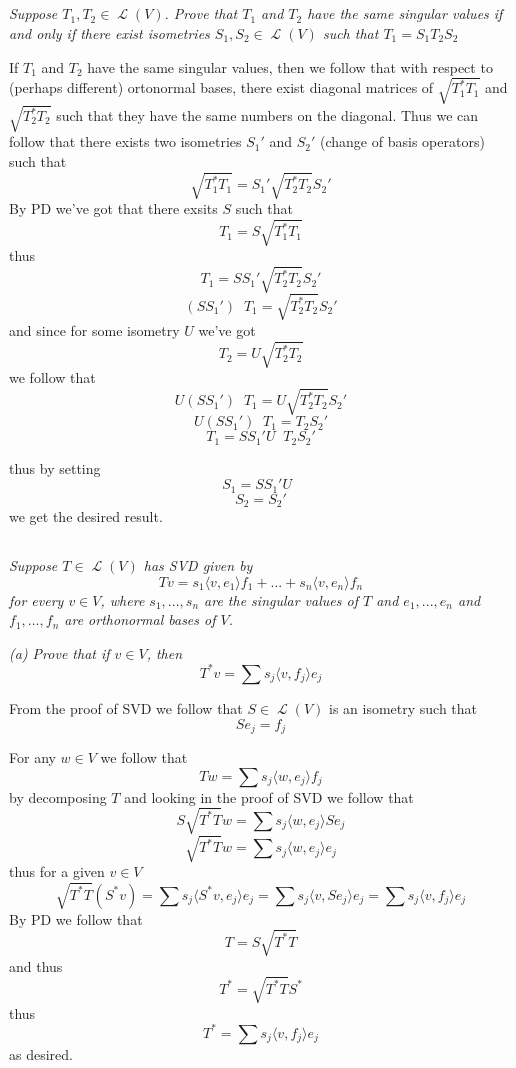\documentclass[11pt,oneside,titlepage]{book}
\DeclareMathOperator \map {\mathcal {L}}
\DeclareMathOperator \inv {^{-1}}
\newcommand{\eangle}[1]{\langle #1 \rangle}
\begin{document}
\subsection{}

\textit{Suppose $T_1, T_2 \in \map(V)$. Prove that $T_1$ and $T_2$ have the same singular values
  if and only if there exist isometries $S_1, S_2 \in \map(V)$ such that $T_1 = S_1 T_2 S_2$}

If $T_1$ and $T_2$ have the same singular values, then we follow that with respect to
(perhaps different) ortonormal bases, there exist diagonal matrices of $\sqrt{T_1^* T_1}$
and $\sqrt{T_2^* T_2}$ such that they have the same numbers on the diagonal. Thus we can
follow that there exists two isometries $S_1'$ and $S_2'$ (change of basis operators) such that
$$\sqrt{T_1^* T_1} = S_1 ' \sqrt{T_2^* T_2} S_2'$$
By PD we've got that there exsits $S$ such that
$$T_1 = S \sqrt{T_1^* T_1}$$
thus
$$T_1 = S S_1 ' \sqrt{T_2^* T_2} S_2'$$
$$(S S_1 ') \inv T_1 =  \sqrt{T_2^* T_2} S_2'$$
and since for some isometry $U$ we've got 
$$T_2 = U \sqrt{T_2^* T_2}$$
we follow that
$$U (S S_1 ') \inv T_1 =  U \sqrt{T_2^* T_2} S_2'$$
$$U (S S_1 ') \inv T_1 =  T_2 S_2'$$
$$T_1 =  S S_1 ' U\inv T_2 S_2'$$

thus by setting
$$S_1 = S S_1 ' U\inv$$
$$S_2 = S_2'$$
we get the desired result.

\subsection{}

\textit{Suppose $T \in \map(V)$ has SVD given by
  $$Tv = s_1 \eangle{v, e_1} f_1 + ... + s_n \eangle{v, e_n} f_n$$
  for every $v \in V$, where $s_1, ..., s_n$ are the singular values of $T$ and
  $e_1, ..., e_n$ and $f_1, ..., f_n$ are orthonormal bases of $V$.
}

\textit{(a) Prove that if $v \in V$, then 
  $$T^*v = \sum{s_j \eangle{v, f_j} e_j}$$
}

From the proof of SVD we follow that $S \in \map(V)$ is an isometry such that
$$S e_j = f_j$$

For any $w \in V$ we follow that 
$$Tw = \sum{ s_j \eangle{w, e_j} f_j}$$
by decomposing $T$ and looking in the proof of SVD we follow that 
$$S \sqrt{T^* T}w = \sum{s_j \eangle{w, e_j} S e_j}$$
$$\sqrt{T^* T}w = \sum{s_j \eangle{w, e_j} e_j}$$
thus for a given $v \in V$
$$\sqrt{T^* T} (S^*v) = \sum{s_j \eangle{S^* v, e_j} e_j} = \sum{s_j \eangle{v, S e_j} e_j} =
\sum{s_j \eangle{v, f_j} e_j} $$
By PD we follow that
$$T = S \sqrt{T^* T}$$
and thus
$$T^* = \sqrt{T^* T}S^* $$
thus
$$T^* = \sum{s_j \eangle{v, f_j} e_j} $$
as desired.
\end{document}

